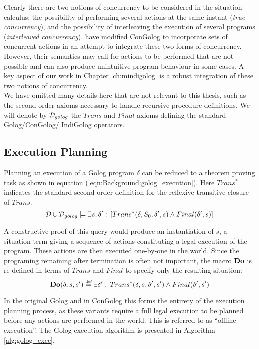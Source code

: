 Clearly there are two notions of concurrency to be considered in the
situation calculus: the possibility of performing several actions
at the same instant (\emph{true concurrency}), and the possibility
of interleaving the execution of several programs (\emph{interleaved
concurrency}). \citet{pinto99tcongolog} have modified ConGolog to
incorporate sets of concurrent actions in an attempt to integrate
these two forms of concurrency. However, their semantics may call
for actions to be performed that are not possible and can also produce
unintuitive program behaviour in some cases. A key aspect of our work
in Chapter \ref{ch:mindigolog} is a robust integration of these two
notions of concurrency.\\


We have omitted many details here that are not relevant to this thesis,
such as the second-order axioms necessary to handle recursive procedure
definitions. We will denote by $\mathcal{D}_{golog}$ the $Trans$ and $Final$
axioms defining the standard Golog/ConGolog/ IndiGolog operators.


\subsection{Execution Planning}

Planning an execution of a Golog program $\delta$ can be reduced
to a theorem proving task as shown in equation (\ref{eqn:Background:golog_execution}).
Here $Trans^{*}$ indicates the standard second-order definition for
the reflexive transitive closure of $Trans$.\begin{equation}
\mathcal{D}\cup\mathcal{D}_{golog}\models\exists s,\delta':\,\left[Trans^{*}(\delta,S_{0},\delta',s)\wedge Final(\delta',s)\right]\label{eqn:Background:golog_execution}\end{equation}


A constructive proof of this query would produce an instantiation
of $s$, a situation term giving a sequence of actions constituting
a legal execution of the program. These actions are then executed
one-by-one in the world. Since the programing remaining after termination
is often not important, the macro $\mathbf{Do}$ is re-defined in terms of
$Trans$ and $Final$ to specify only the resulting situation:\[
\mathbf{Do}(\delta,s,s')\stackrel{\mbox{\tiny def}}{=}\exists\delta':\, Trans^{*}(\delta,s,\delta',s')\wedge Final(\delta',s')\]


In the original Golog and in ConGolog this forms the entirety of the
execution planning process, as these variants require a full legal
execution to be planned before any actions are performed in the world.
This is referred to as {}``offline execution''. The Golog execution
algorithm is presented in Algorithm \ref{alg:golog_exec}.

